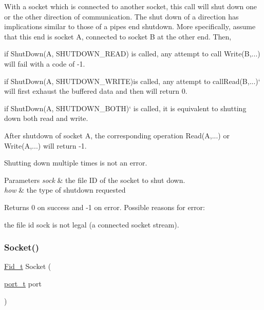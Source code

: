 With a socket which is connected to another socket, this call will shut down one or the other direction of communication. The shut down of a direction has implications similar to those of a pipe\textquotesingle{}s end shutdown. More specifically, assume that this end is socket A, connected to socket B at the other end. Then,


\begin{DoxyItemize}
\item if {\ttfamily Shut\+Down(\+A, S\+H\+U\+T\+D\+O\+W\+N\+\_\+\+R\+E\+A\+D)} is called, any attempt to call {\ttfamily Write(B,...)} will fail with a code of -\/1.
\item if Shut\+Down(\+A, S\+H\+U\+T\+D\+O\+W\+N\+\_\+\+W\+R\+I\+T\+E){\ttfamily is called, any attempt to call}Read(B,...)` will first exhaust the buffered data and then will return 0.
\item if Shut\+Down(\+A, S\+H\+U\+T\+D\+O\+W\+N\+\_\+\+B\+O\+T\+H)` is called, it is equivalent to shutting down both read and write.
\end{DoxyItemize}

After shutdown of socket A, the corresponding operation {\ttfamily Read(A,...)} or {\ttfamily Write(A,...)} will return -\/1.

Shutting down multiple times is not an error.


\begin{DoxyParams}{Parameters}
{\em sock} & the file ID of the socket to shut down. \\
\hline
{\em how} & the type of shutdown requested \\
\hline
\end{DoxyParams}
\begin{DoxyReturn}{Returns}
0 on success and -\/1 on error. Possible reasons for error\+:
\begin{DoxyItemize}
\item the file id {\ttfamily sock} is not legal (a connected socket stream). 
\end{DoxyItemize}
\end{DoxyReturn}
\mbox{\label{group__syscalls_gadf167321edde68e905173d8056d3eb2f}} 
\subsubsection{\texorpdfstring{Socket()}{Socket()}}
{\footnotesize\ttfamily \hyperlink{group__syscalls_ga5097222c5f0da97d92d4712359abc38f}{Fid\+\_\+t} Socket (\begin{DoxyParamCaption}\item[{\hyperlink{group__syscalls_ga13894e5a2ffd5febb7aeb90e87239d61}{port\+\_\+t}}]{port }\end{DoxyParamCaption})}




